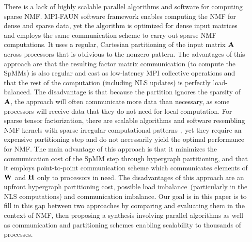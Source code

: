There is a lack of highly scalable parallel algorithms and software for computing sparse NMF.
MPI-FAUN \cite{KBP17} software framework enables computing the NMF for dense and sparse data, yet the algorithm is optimized for dense input matrices and employs the same communication scheme to carry out sparse NMF computations.
It uses a regular, Cartesian partitioning of the input matrix $\AA$ across processors that is oblivious to the nonzero pattern.
The advantages of this approach are that the resulting factor matrix communication (to compute the SpMMs) is also regular and cast as low-latency MPI collective operations and that the rest of the computation (including NLS updates) is perfectly load-balanced.
The disadvantage is that because the partition ignores the sparsity of $\AA$, the approach will often communicate more data than necessary, as some processors will receive data that they do not need for local computation.
For sparse tensor factorization, there are scalable algorithms and software resembling NMF kernels with sparse irregular computational patterns~\cite{KU15}, yet they require an expensive partitioning step and do not necessarily yield the optimal performance for NMF.
The main advantage of this approach is that it minimizes the communication cost of the SpMM step through hypergraph partitioning, and that it employs point-to-point communication scheme which communicates elements of $\WW$ and $\HH$ only to processors in need.
The disadvantages of this approach are an upfront hypergraph partitioning cost, possible load imbalance~(particularly in the NLS computations) and communication imbalance.
Our goal is in this paper is to fill in this gap between two approaches by comparing and evaluating them in the context of NMF, then proposing a synthesis involving parallel algorithms as well as communication and partitioning schemes enabling scalability to thousands of processes.


